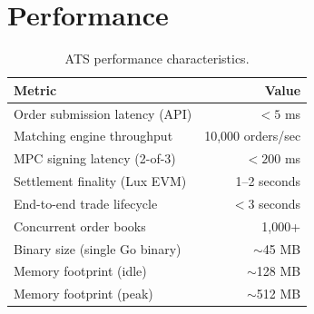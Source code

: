 \section{Performance}
\label{sec:performance}

\begin{table}[H]
\centering
\caption{ATS performance characteristics.}
\label{tab:performance}
\begin{tabular}{lr}
\toprule
\textbf{Metric} & \textbf{Value} \\
\midrule
Order submission latency (API) & $< 5$ ms \\
Matching engine throughput & 10,000 orders/sec \\
MPC signing latency (2-of-3) & $< 200$ ms \\
Settlement finality (Lux EVM) & 1--2 seconds \\
End-to-end trade lifecycle & $< 3$ seconds \\
Concurrent order books & 1,000+ \\
Binary size (single Go binary) & $\sim$45 MB \\
Memory footprint (idle) & $\sim$128 MB \\
Memory footprint (peak) & $\sim$512 MB \\
\bottomrule
\end{tabular}
\end{table}

